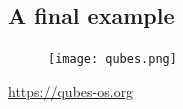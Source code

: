 %

\subsection{A final example}

\begin{frame}
  \begin{figure}
    \texttt{[image: qubes.png]}
  \end{figure}
  \url{https://qubes-os.org}
\end{frame}



\begin{frame}[allowframebreaks]
  \printbibliography
\end{frame}

